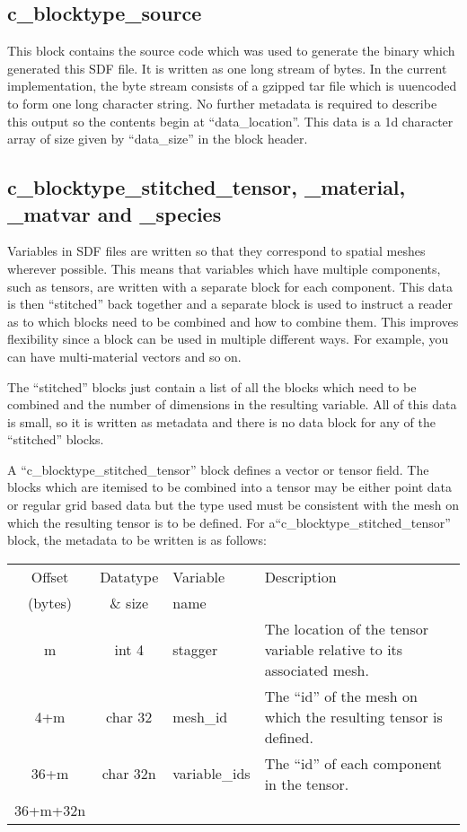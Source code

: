 \documentclass[12pt]{article}
\newcommand{\subsubsec}{\subsection}
\begin{document}
\subsubsec{c\_blocktype\_source}

This block contains the source code which was used to generate the binary
which generated this SDF file. It is written as one long stream of bytes.
In the current implementation, the byte stream consists of a gzipped
tar file which is uuencoded to form one long character string. No further
metadata is required to describe this output so the contents begin at
``data\_location''. This data is a 1d character array of size given by
``data\_size'' in the block header.


\subsubsec{c\_blocktype\_stitched\_tensor, \_material, \_matvar and \_species}

Variables in SDF files are written so that they correspond to spatial meshes
wherever possible. This means that variables which have multiple components,
such as tensors, are written with a separate block for each component. This
data is then ``stitched'' back together and a separate block is used to
instruct a reader as to which blocks need to be combined and how to combine
them. This improves flexibility since a block can be used in multiple different
ways. For example, you can have multi-material vectors and so on.

The ``stitched'' blocks just contain a list of all the blocks which need to
be combined and the number of dimensions in the resulting variable.
All of this data is small, so it is written as metadata and there is no
data block for any of the ``stitched'' blocks.

A ``c\_blocktype\_stitched\_tensor'' block defines a vector or tensor
field. The blocks which are itemised to be combined into a tensor
may be either point data or regular grid based data but the
type used must be consistent with the mesh on which the resulting tensor
is to be defined.
For a\linebreak ``c\_blocktype\_stitched\_tensor'' block, the metadata to be
written is as follows:\\

\begin{center}
\begin{tabularx}{0.9\textwidth}[!hbt]{cclX}
  Offset & Datatype & Variable & Description\\
  (bytes) & \& size & name &
  \\\toprule

  m & int 4 & stagger & The location of the tensor variable relative to
  its associated mesh.
  \\\midrule

  4+m & char 32 & mesh\_id & The ``id'' of the mesh on which the resulting
  tensor is defined.
  \\\midrule

  36+m & char 32n & variable\_ids & The ``id'' of each component in the tensor.
  \\\midrule

  36+m+32n &
\end{tabularx}
\end{center}\vspace{10pt}
\end{document}
